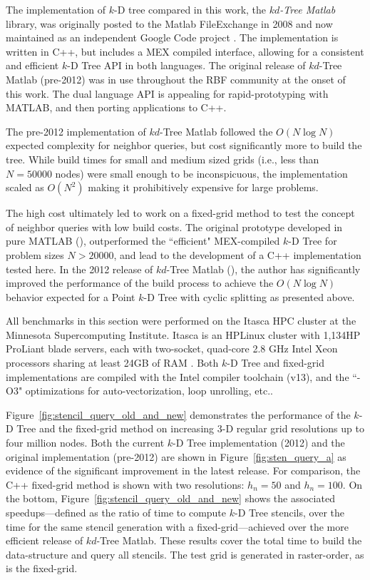 \documentclass{report}
\begin{document}
The implementation of $k$-D tree compared in this work, the \emph{$kd$-Tree Matlab} library, was originally posted to the Matlab FileExchange in 2008 \cite{TagliasacchiMFE} and now maintained as an independent Google Code project \cite{TagliasacchiGC}. The implementation is written in C++, but includes a MEX compiled interface, allowing for a consistent and efficient $k$-D Tree API in both languages. 
The original release of $kd$-Tree Matlab (pre-2012) was in use throughout the RBF community at the onset of this work. The dual language API is appealing for rapid-prototyping with MATLAB, and then porting applications to C++. 

The pre-2012 implementation of $kd$-Tree Matlab followed the $O(N \log N)$ expected complexity for neighbor queries, but cost significantly more to build the tree. While build times for small and medium sized grids (i.e., less than $N=50000$ nodes) were small enough to be inconspicuous, the implementation scaled as $O(N^2)$ making it prohibitively expensive for large problems. 

The high cost ultimately led to work on a fixed-grid method to test the concept of neighbor queries with low build costs. The original prototype developed in pure MATLAB (\cite{BolligRBFFixedGrid}), outperformed the ``efficient" MEX-compiled $k$-D Tree for problem sizes $N > 20000$, and lead to the development of a C++ implementation tested here. In the 2012 release of $kd$-Tree Matlab (\cite{TagliasacchiGC}), the author has significantly improved the performance of the build process to achieve the $O(N \log N)$ behavior expected for a Point $k$-D Tree with cyclic splitting as presented above. 

All benchmarks in this section were performed on the Itasca HPC cluster at the Minnesota Supercomputing Institute. Itasca is an HPLinux cluster with 1,134HP ProLiant blade servers, each with two-socket, quad-core 2.8 GHz Intel Xeon processors sharing at least 24GB of RAM \cite{MSIItasca}. Both $k$-D Tree and fixed-grid implementations are compiled with the Intel compiler toolchain (v13), and the ``-O3" optimizations for auto-vectorization, loop unrolling, etc.. 

Figure~\ref{fig:stencil_query_old_and_new} demonstrates the performance of the $k$-D Tree and the fixed-grid method on increasing 3-D regular grid resolutions up to four million nodes. Both the current $k$-D Tree implementation (2012) and the original implementation (pre-2012) are shown in Figure~\ref{fig:sten_query_a} as evidence of the significant improvement in the latest release. For comparison, the C++ fixed-grid method is shown with two resolutions: $h_n = 50$ and $h_n=100$. On the bottom, Figure~\ref{fig:stencil_query_old_and_new} shows the associated speedups---defined as the ratio of time to compute $k$-D Tree stencils, over the time for the same stencil generation with a fixed-grid---achieved over the more efficient release of $kd$-Tree Matlab. These results cover the total time to build the data-structure and query all stencils. The test grid is generated in raster-order, as is the fixed-grid. 
\end{document}
